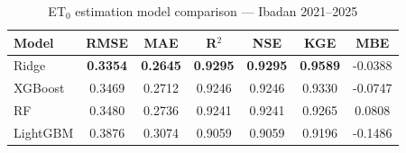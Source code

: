 \begin{table}[htbp]
  \centering
  \caption{ET$_0$ estimation model comparison — Ibadan 2021–2025}
  \label{tab:et0}
  \begin{tabular}{lcccccc}
    \toprule
    Model & RMSE & MAE & R$^2$ & NSE & KGE & MBE \\
    \midrule
    Ridge & \textbf{0.3354} & \textbf{0.2645} & \textbf{0.9295} & \textbf{0.9295} & \textbf{0.9589} & -0.0388 \\
    XGBoost & 0.3469 & 0.2712 & 0.9246 & 0.9246 & 0.9330 & -0.0747 \\
    RF & 0.3480 & 0.2736 & 0.9241 & 0.9241 & 0.9265 & 0.0808 \\
    LightGBM & 0.3876 & 0.3074 & 0.9059 & 0.9059 & 0.9196 & -0.1486 \\
    \bottomrule
  \end{tabular}
\end{table}

